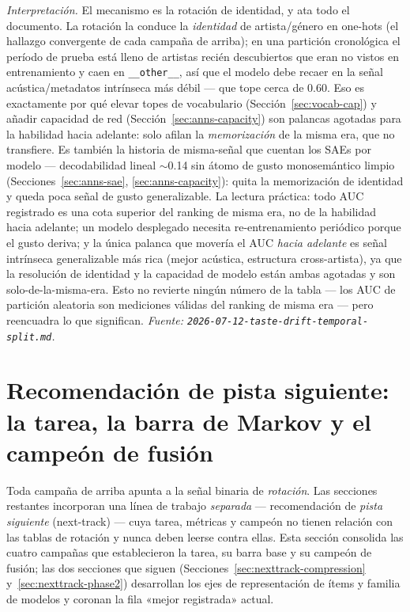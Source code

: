 \documentclass[11pt]{article}
\begin{document}
\emph{Interpretación.} El mecanismo es la rotación de identidad, y ata todo el
documento. La rotación la conduce la \emph{identidad} de artista/género en
one-hots (el hallazgo convergente de cada campaña de arriba); en una partición
cronológica el período de prueba está lleno de artistas recién descubiertos que
eran no vistos en entrenamiento y caen en \texttt{\_\_other\_\_}, así que el modelo
debe recaer en la señal acústica/metadatos intrínseca más débil --- que tope cerca
de \num{0.60}. Eso es exactamente por qué elevar topes de vocabulario
(Sección~\ref{sec:vocab-cap}) y añadir capacidad de red (Sección~\ref{sec:anns-capacity})
son palancas agotadas para la habilidad hacia adelante: solo afilan la
\emph{memorización} de la misma era, que no transfiere. Es también la historia de
misma-señal que cuentan los SAEs por modelo --- decodabilidad lineal $\sim$0.14 sin
átomo de gusto monosemántico limpio (Secciones~\ref{sec:anns-sae},
\ref{sec:anns-capacity}): quita la memorización de identidad y queda poca señal de
gusto generalizable. La lectura práctica: todo AUC registrado es una cota superior
del ranking de misma era, no de la habilidad hacia adelante; un modelo desplegado
necesita re-entrenamiento periódico porque el gusto deriva; y la única palanca que
movería el AUC \emph{hacia adelante} es señal intrínseca generalizable más rica
(mejor acústica, estructura cross-artista), ya que la resolución de identidad y la
capacidad de modelo están ambas agotadas y son solo-de-la-misma-era. Esto no
revierte ningún número de la tabla --- los AUC de partición aleatoria son
mediciones válidas del ranking de misma era --- pero reencuadra lo que significan.
\emph{Fuente: \texttt{2026-07-12-taste-drift-temporal-split.md}.}

\section{Recomendación de pista siguiente: la tarea, la barra de Markov y el campeón de fusión}
\label{sec:nexttrack}
Toda campaña de arriba apunta a la señal binaria de \emph{rotación}. Las secciones
restantes incorporan una línea de trabajo \emph{separada} --- recomendación de
\emph{pista siguiente} (next-track) --- cuya tarea, métricas y campeón no tienen
relación con las tablas de rotación y nunca deben leerse contra ellas. Esta
sección consolida las cuatro campañas que establecieron la tarea, su barra base y
su campeón de fusión; las dos secciones que siguen
(Secciones~\ref{sec:nexttrack-compression} y~\ref{sec:nexttrack-phase2})
desarrollan los ejes de representación de ítems y familia de modelos y coronan la
fila «mejor registrada» actual.
\end{document}

